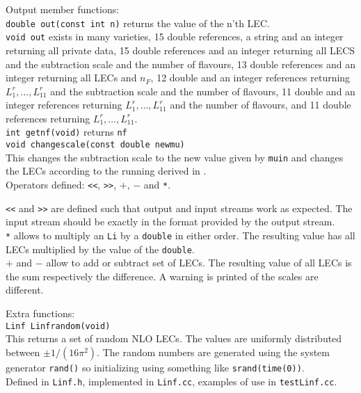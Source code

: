\documentclass[12pt,a4paper]{article}
\newcommand{\mytt}[1]{\texttt{#1}}
\newcommand{\newfunction}[1]{\mytt{#1}\index{\mytt{#1}}}
\begin{document}
Output member functions:\\
\mytt{double \newfunction{out}(const int n)} returns the value of the n'th LEC.\\
\mytt{void out} exists in many varieties, 15 double references, a string
and an integer
returning all private data, 15 double references and an integer returning all LECS and the subtraction scale and the number of flavours, 13 double references
and an integer returning all LECs and $n_F$,
12 double and an integer references returning $L_1^r,\ldots,L_{11}^r$ and the subtraction scale and the number of flavours,
11 double and an integer references returning $L_1^r,\ldots,L_{11}^r$  and the number of flavours,
and 11 double references returning $L_1^r,\ldots,L_{11}^r$.\\
\mytt{int \newfunction{getnf}(void)} returns \mytt{nf}\\

\mytt{void \newfunction{changescale}(const double newmu)}\\
This changes the subtraction scale to the new value given by \mytt{muin} and
changes the LECs according to the running derived
in \cite{Gasser:1984gg}.\\

Operators defined: \newfunction{<<}, \newfunction{>>}, \newfunction{$+$}, \newfunction{$-$} and \newfunction{*}.

\mytt{<<} and \mytt{>>} are  defined such that output and input
streams work as expected. The input stream should be exactly in the format
provided by the output stream.\\
\mytt{*} allows to multiply an \mytt{Li} by a \mytt{double} in either order.
The resulting value has all LECs multiplied by the value of the \mytt{double}.\\
\mytt{$+$} and \mytt{$-$} allow to add or subtract set of LECs.
The resulting value of all LECs is the sum respectively the difference.
A warning is printed of the scales are different.

Extra functions:\\
\mytt{Linf \newfunction{Linfrandom}(void)}\\
This returns a set of random NLO LECs.
The values are uniformly distributed between $\pm1/(16\pi^2)$.
The random numbers are generated using the
system generator \mytt{rand()} so initializing using something like
\mytt{srand(time(0))}.\\

Defined in \mytt{Linf.h}, implemented in \mytt{Linf.cc},
examples of use in \mytt{testLinf.cc}.
\end{document}
